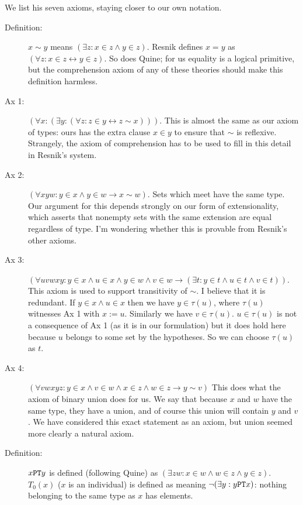 \documentclass[12pt]{article}
\begin{document}
We list his seven axioms, staying closer to our own notation.

\begin{description}

\item[Definition:]  $x \sim y$ means $(\exists z:x \in z \wedge y \in z)$.  Resnik defines
$x=y$ as $(\forall z:x \in z \leftrightarrow y \in z)$.  So does Quine; for us equality is a logical primitive, but the comprehension axiom
of any of these theories should make this definition harmless.

\item[Ax 1:]  $(\forall x:(\exists y:(\forall z:z \in y \leftrightarrow z \sim x)))$.  This is almost the same as our axiom of types:  ours has the extra clause $x \in y$ to ensure that $\sim$ is reflexive.  Strangely, the axiom of comprehension has to be used to fill in this detail in Resnik's system.

\item[Ax 2:] $(\forall xyw:y \in x \wedge y \in w \rightarrow x \sim w)$.  Sets which meet have the same type.   Our argument for this depends strongly on our form of extensionality, which asserts that nonempty sets with the same extension are equal regardless of type.  I'm wondering whether this is provable from Resnik's other axioms.  

\item[Ax 3:]  $(\forall uvwxy:  y \in x \wedge u \in x \wedge y \in w \wedge v \in w \rightarrow (\exists t:y \in t \wedge u \in t \wedge v \in t))$.  This axiom is used to support transitivity of $\sim$.  I believe that it is redundant.  If $y \in x \wedge u \in x$ then we have $y \in \tau(u)$, where $\tau(u)$ witnesses
Ax 1 with $x := u$.  Similarly we have $v \in \tau(u)$.  $u \in \tau(u)$ is not a consequence of Ax 1 (as it is in our formulation) but it does hold here because
$u$ belongs to some set by the hypotheses.  So we can choose $\tau(u)$ as $t$.

\item[Ax 4:]  $(\forall vwxyz:y \in x \wedge v \in w \wedge x \in z \wedge w \in z \rightarrow y \sim v)$  This does what the axiom of binary union does for us.  We say that because $x$ and $w$ have the same type, they have a union, and of course this union will contain $y$ and $v$.  We have considered this exact statement as an axiom, but union seemed more clearly a natural axiom.

\item[Definition:]  $x {\tt PT} y$ is defined (following Quine) as $(\exists zw:x \in w \wedge w \in z \wedge y \in z)$.  $T_0(x)$ ($x$ is an individual)
is defined as meaning $\neg(\exists y:y {\tt PT} x)$:  nothing belonging to the same type as $x$ has elements.


\end{description}
\end{document}
